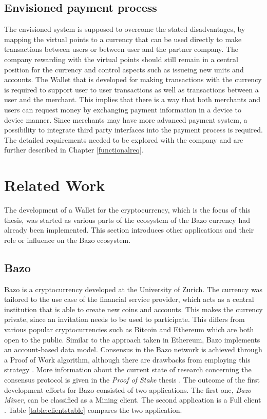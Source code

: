 \subsection{Envisioned payment process}\label{envisionedpaymentprocess}
The envisioned system is supposed to overcome the stated disadvantages, by mapping the virtual points to a currency that can be used directly to make transactions between users or between user and the partner company.
The company rewarding with the virtual points should still remain in a central position for the currency and control aspects such as issueing new units and accounts.
The Wallet that is developed for making transactions with the currency is required to support user to user transactions as well as transactions between a user and the merchant. This implies that there is a way that both merchants and users can request money by exchanging payment information in a device to device manner. Since merchants may have more advanced payment system, a possibility to integrate third party interfaces into the payment process is required. The detailed requirements needed to be explored with the company and are further described in Chapter \ref{functionalreq}.


\section{Related Work}
The development of a Wallet for the cryptocurrency, which is the focus of this thesis, was started as various parts of the ecosystem of the Bazo currency had already been implemented. This section introduces other applications and their role or influence on the Bazo ecosystem.
\subsection{Bazo}
Bazo is a cryptocurrency developed at the University of Zurich. The currency was tailored to the use case of the financial service provider, which acts as a central institution that is able to create new coins and accounts. This makes the currency private, since an invitation needs to be used to participate. This differs from various popular cryptocurrencies such as Bitcoin and Ethereum which are both open to the public. Similar to the approach taken in Ethereum, Bazo implements an account-based data model. Consensus in the Bazo network is achieved through a Proof of Work algorithm, although there are drawbacks from employing this strategy \cite{lisg}. More information about the current state of research concerning the consensus protocol is given in the \textit{Proof of Stake} thesis \cite{proofofstake}.
The outcome of the first development efforts for Bazo consisted of two applications. The first one, \textit{Bazo Miner}, can be classified as a Mining client. The second application is a Full client \cite{bitcoinclients}. Table \ref{table:clientstable} compares the two application.
